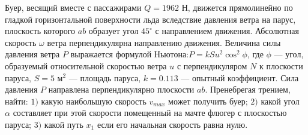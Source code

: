 Буер, весящий вместе с пассажирами $Q=1962$ Н, движется прямолинейно по
гладкой горизонтальной поверхности льда вследствие давления ветра
на парус, плоскость которого $ab$ образует угол $45^{\circ}$ с
направлением движения. Абсолютная скорость $\omega$ ветра
перпендикулярна направлению движения. Величина силы давления ветра
$P$ выражается формулой Ньютона:$P=kSu^2\cos^2\phi$,
где $\phi$ --- угол, образуемый относительной скоростью ветра $u$ с
перпендикуляром $N$ к плоскости паруса, $S=5$ м$^2$ --- площадь
паруса, $k=0.113$ --- опытный коэффициент. Сила давления $P$ направлена
перпендикулярно плоскости $ab$. Пренебрегая трением, найти:
$1)$ какую наибольшую скорость $v_{max}$ может получить буер;
$2)$ какой угол $\alpha$ составляет при этой скорости помещенный на мачте
флюгер с плоскостью паруса;
$3)$ какой путь $x_{1}$ если его начальная скорость равна нулю.
